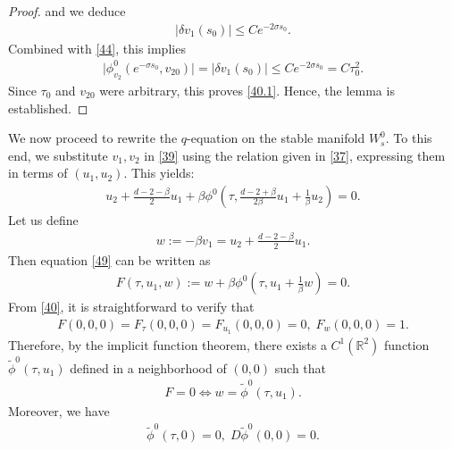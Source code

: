 \documentclass[12pt]{amsart}
\newcommand{\R}{\mathbb R}
\begin{document}
\begin{proof}
and we deduce
\begin{align}\label{47}
|\delta v_1(s_0)|\le Ce^{-2\sigma s_0}.
\end{align}
Combined with \eqref{44}, this implies 
\begin{align*}
\bigl|\phi^0_{v_2}(e^{-\sigma s_0}, v_{20})\bigr|=|\delta v_1(s_0)|\le C e^{-2\sigma s_0} = C \tau_0^2. 
\end{align*}
Since $\tau_0$ and $v_{20}$ were arbitrary, this proves \eqref{40.1}. Hence, the lemma is established. 
\end{proof}

We now proceed to rewrite the $q$-equation on the stable manifold $W_s^0$. To this end, we substitute $v_1, v_2$ in \eqref{39} using the relation given in \eqref{37}, expressing them in terms of $(u_1, u_2)$. This yields:
\begin{align}\label{49}
u_2+\tfrac{d-2-\beta}2 u_1+\beta \phi^0(\tau, \tfrac{d-2+\beta}{2\beta}u_1+\tfrac 1\beta u_2)=0. 
\end{align}
Let us define
\begin{align}\label{31}
w:=-\beta v_1= u_2+\tfrac{d-2-\beta}2 u_1.
\end{align}
Then equation \eqref{49} can be written as 
\begin{align}\label{32}
F(\tau, u_1, w):=w+\beta \phi^0(\tau, u_1+\tfrac 1\beta w)=0.
\end{align}
From \eqref{40}, it is straightforward to verify that 
\begin{align*}
F(0, 0, 0)=F_\tau(0,0,0)=F_{u_1}(0,0,0)=0, \; F_w(0,0,0)=1. 
\end{align*}
Therefore, by the implicit function theorem, there exists a $C^1(\R^2)$ function $\tilde \phi^0(\tau, u_1)$ defined in a neighborhood of $(0,0)$ such that 
\begin{align}\label{32.1}
F=0 \Longleftrightarrow w=\tilde \phi^0(\tau, u_1).
\end{align}
Moreover, we have
\begin{align}\label{33}
\tilde \phi^0(\tau, 0)=0, \; D \tilde \phi^0(0,0)=0.
\end{align}
\end{document}
